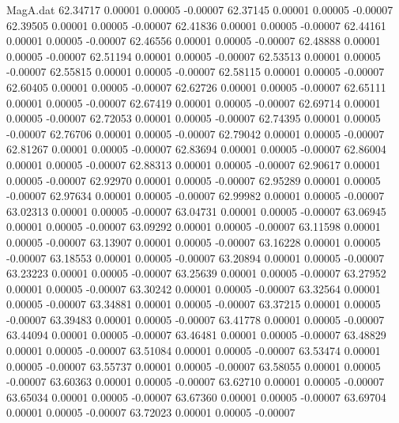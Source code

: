 \begin{filecontents}{MagA.dat}
  62.34717    0.00001    0.00005   -0.00007
  62.37145    0.00001    0.00005   -0.00007
  62.39505    0.00001    0.00005   -0.00007
  62.41836    0.00001    0.00005   -0.00007
  62.44161    0.00001    0.00005   -0.00007
  62.46556    0.00001    0.00005   -0.00007
  62.48888    0.00001    0.00005   -0.00007
  62.51194    0.00001    0.00005   -0.00007
  62.53513    0.00001    0.00005   -0.00007
  62.55815    0.00001    0.00005   -0.00007
  62.58115    0.00001    0.00005   -0.00007
  62.60405    0.00001    0.00005   -0.00007
  62.62726    0.00001    0.00005   -0.00007
  62.65111    0.00001    0.00005   -0.00007
  62.67419    0.00001    0.00005   -0.00007
  62.69714    0.00001    0.00005   -0.00007
  62.72053    0.00001    0.00005   -0.00007
  62.74395    0.00001    0.00005   -0.00007
  62.76706    0.00001    0.00005   -0.00007
  62.79042    0.00001    0.00005   -0.00007
  62.81267    0.00001    0.00005   -0.00007
  62.83694    0.00001    0.00005   -0.00007
  62.86004    0.00001    0.00005   -0.00007
  62.88313    0.00001    0.00005   -0.00007
  62.90617    0.00001    0.00005   -0.00007
  62.92970    0.00001    0.00005   -0.00007
  62.95289    0.00001    0.00005   -0.00007
  62.97634    0.00001    0.00005   -0.00007
  62.99982    0.00001    0.00005   -0.00007
  63.02313    0.00001    0.00005   -0.00007
  63.04731    0.00001    0.00005   -0.00007
  63.06945    0.00001    0.00005   -0.00007
  63.09292    0.00001    0.00005   -0.00007
  63.11598    0.00001    0.00005   -0.00007
  63.13907    0.00001    0.00005   -0.00007
  63.16228    0.00001    0.00005   -0.00007
  63.18553    0.00001    0.00005   -0.00007
  63.20894    0.00001    0.00005   -0.00007
  63.23223    0.00001    0.00005   -0.00007
  63.25639    0.00001    0.00005   -0.00007
  63.27952    0.00001    0.00005   -0.00007
  63.30242    0.00001    0.00005   -0.00007
  63.32564    0.00001    0.00005   -0.00007
  63.34881    0.00001    0.00005   -0.00007
  63.37215    0.00001    0.00005   -0.00007
  63.39483    0.00001    0.00005   -0.00007
  63.41778    0.00001    0.00005   -0.00007
  63.44094    0.00001    0.00005   -0.00007
  63.46481    0.00001    0.00005   -0.00007
  63.48829    0.00001    0.00005   -0.00007
  63.51084    0.00001    0.00005   -0.00007
  63.53474    0.00001    0.00005   -0.00007
  63.55737    0.00001    0.00005   -0.00007
  63.58055    0.00001    0.00005   -0.00007
  63.60363    0.00001    0.00005   -0.00007
  63.62710    0.00001    0.00005   -0.00007
  63.65034    0.00001    0.00005   -0.00007
  63.67360    0.00001    0.00005   -0.00007
  63.69704    0.00001    0.00005   -0.00007
  63.72023    0.00001    0.00005   -0.00007

\end{filecontents}
